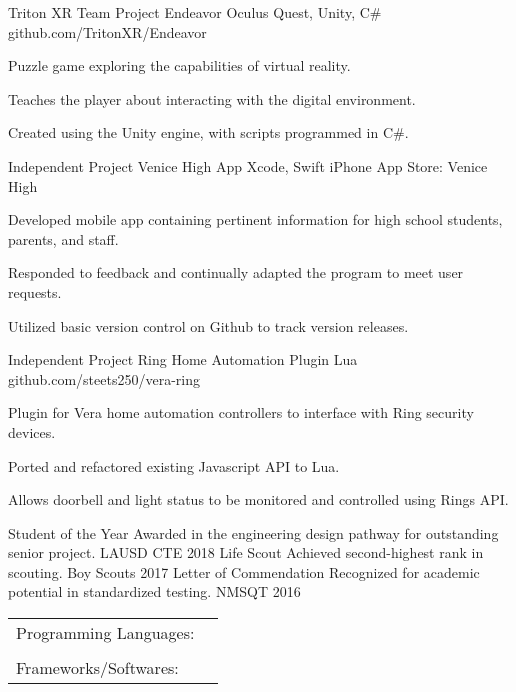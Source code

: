 \documentclass[]{awesome-cv}
\begin{document}
\begin{cventries}
	\cventry
	{Triton XR Team Project}
	{Endeavor}
	{Oculus Quest, Unity, C\#}
	{github.com/TritonXR/Endeavor}
	{\begin{cvitems}
		\item {Puzzle game exploring the capabilities of virtual reality.}
		\item {Teaches the player about interacting with the digital environment.}
		\item {Created using the Unity engine, with scripts programmed in C\#.}
		\end{cvitems}}
	\cventry
	{Independent Project}
	{Venice High App}
	{Xcode, Swift}
	{iPhone App Store: \textquotedbl{}Venice High\textquotedbl{}}
	{\begin{cvitems}
		\item {Developed mobile app containing pertinent information for high school students, parents, and staff.}
		\item {Responded to feedback and continually adapted the program to meet user requests.}
		\item {Utilized basic version control on Github to track version releases.}
		\end{cvitems}}
	\cventry
	{Independent Project}
	{Ring Home Automation Plugin}
	{Lua}
	{github.com/steets250/vera-ring}
	{\begin{cvitems}
		\item {Plugin for Vera home automation controllers to interface with Ring security devices.}
		\item {Ported and refactored existing Javascript API to Lua.}
		\item {Allows doorbell and light status to be monitored and controlled using Ring\textquotesingle{}s API.}
		\end{cvitems}}
	\vspace{-5mm}
\end{cventries}

\begin{cvhonors}
	\cvhonor
	{Student of the Year}
	{Awarded in the engineering design pathway for outstanding senior project.}
	{LAUSD CTE}
	{2018}
	\cvhonor
	{Life Scout}
	{Achieved second-highest rank in scouting.}
	{Boy Scouts}
	{2017}
	\cvhonor
	{Letter of Commendation}
	{Recognized for academic potential in standardized testing.}
	{NMSQT}
	{2016}
\end{cvhonors}

\begin{cventries}
	\cventry
	{}
	{\def\arraystretch{1.15}{\begin{tabular}{ l l }
		Programming Languages:  & {\skill{ Java, Swift, C, Javascript, HTML/CSS, C\#, ARM}} \\
		 \\
		Frameworks/Softwares:  & {\skill{ Git/GitHub, Xcode, Node.js, React, Npm/Yarn, Unity}} \\
		\end{tabular}}}
	{}
	{}
	{}
\end{cventries}
\vspace{-7mm}
\ 
\end{document}
